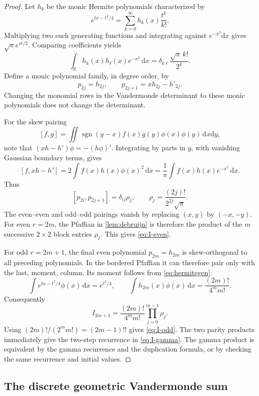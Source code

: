 \documentclass[11pt]{article}
\numberwithin{equation}{section}
\theoremstyle{definition}
\newcommand{\RR}{\mathbb{R}}
\newcommand{\dd}{\mathrm{d}}
\newcommand{\sgn}{\operatorname{sgn}}
\begin{document}
\begin{proof}
Let $h_k$ be the monic Hermite polynomials characterized by
\begin{equation}\label{eq:hermitegen}
 e^{tx-t^2/4}=\sum_{k=0}^{\infty}h_k(x)\frac{t^k}{k!}.
\end{equation}
Multiplying two such generating functions and integrating against $e^{-x^2}\dd x$ gives $\sqrt\pi e^{st/2}$. Comparing coefficients yields
\begin{equation}\label{eq:hermiteortho}
 \int_{\RR}h_k(x)h_\ell(x)e^{-x^2}\,\dd x
 =\delta_{k\ell}\frac{\sqrt\pi\,k!}{2^k}.
\end{equation}
Define a monic polynomial family, in degree order, by
\[
 p_{2j}=h_{2j},\qquad p_{2j+1}=x h_{2j}-h'_{2j}.
\]
Changing the monomial rows in the Vandermonde determinant to these monic polynomials does not change the determinant.

For the skew pairing
\[
 [f,g]=\iint\sgn(y-x)f(x)g(y)\phi(x)\phi(y)\,\dd x\dd y,
\]
note that $(x h-h')\phi=-(h\phi)'$. Integrating by parts in $y$, with vanishing Gaussian boundary terms, gives
\begin{equation}\label{eq:skewip}
 [f,xh-h']=2\int f(x)h(x)\phi(x)^2\,\dd x
           =\frac1\pi\int f(x)h(x)e^{-x^2}\,\dd x.
\end{equation}
Thus
\[
 [p_{2i},p_{2j+1}]=\delta_{ij}\rho_j,
 \qquad \rho_j=\frac{(2j)!}{2^{2j}\sqrt\pi}.
\]
The even--even and odd--odd pairings vanish by replacing $(x,y)$ by $(-x,-y)$. For even $r=2m$, the Pfaffian in \cref{lem:debruijn} is therefore the product of the $m$ successive $2\times2$ block entries $\rho_j$. This gives \eqref{eq:I-even}.

For odd $r=2m+1$, the final even polynomial $p_{2m}=h_{2m}$ is skew-orthogonal to all preceding polynomials. In the bordered Pfaffian it can therefore pair only with the last, moment, column. Its moment follows from \eqref{eq:hermitegen}:
\[
 \int e^{tx-t^2/4}\phi(x)\,\dd x=e^{t^2/4},\qquad
 \int h_{2m}(x)\phi(x)\,\dd x=\frac{(2m)!}{4^m m!}.
\]
Consequently
\[
 I_{2m+1}=\frac{(2m)!}{4^m m!}\prod_{j=0}^{m-1}\rho_j.
\]
Using $(2m)!/(2^m m!)=(2m-1)!!$ gives \eqref{eq:I-odd}. The two parity products immediately give the two-step recurrence in \eqref{eq:I-gamma}. The gamma product is equivalent by the gamma recurrence and the duplication formula, or by checking the same recurrence and initial values.
\end{proof}

\subsection{The discrete geometric Vandermonde sum}
\end{document}
